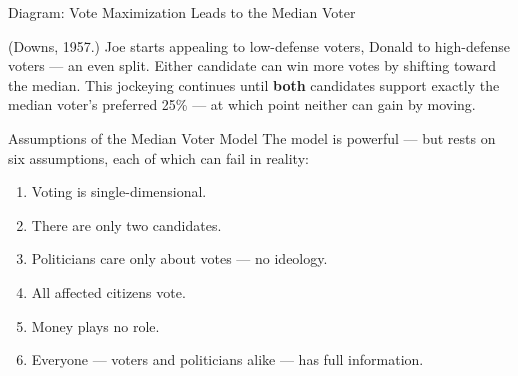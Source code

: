 \documentclass[11pt,aspectratio=169]{beamer}
\begin{document}
\begin{frame}{Diagram: Vote Maximization Leads to the Median Voter}
  \begin{center}
  \end{center}
  \vspace{0.6em}
  \footnotesize (Downs, 1957.) Joe starts appealing to low-defense voters, Donald to high-defense voters --- an even split. Either candidate can win more votes by shifting toward the median. This jockeying continues until \textbf{both} candidates support exactly the median voter's preferred 25\% --- at which point neither can gain by moving.
\end{frame}

\begin{frame}{Assumptions of the Median Voter Model}
  The model is powerful --- but rests on six assumptions, each of which can fail in reality:
  \begin{enumerate}
    \setlength{\itemsep}{2pt}
    \item Voting is single-dimensional.
    \item There are only two candidates.
    \item Politicians care only about votes --- no ideology.
    \item All affected citizens vote.
    \item Money plays no role.
    \item Everyone --- voters and politicians alike --- has full information.
  \end{enumerate}
\end{frame}
\end{document}
